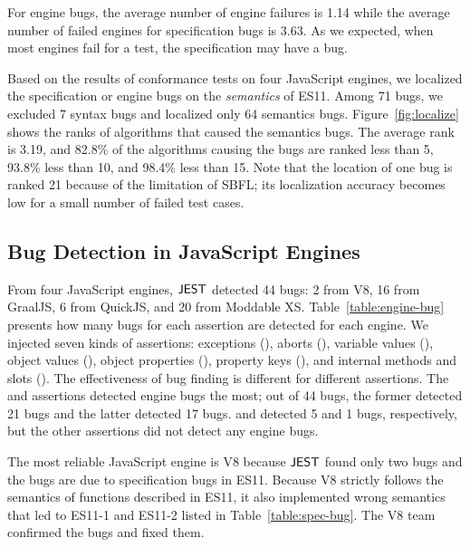 \noindent
For engine bugs, the average number of engine failures is 1.14
while the average number of failed engines for specification bugs is 3.63.
As we expected, when most engines fail for a test, the specification
may have a bug.

Based on the results of conformance tests on four JavaScript engines, we localized
the specification or engine bugs on the \emph{semantics} of ES11.
Among 71 bugs, we excluded 7 syntax bugs and localized only 64 semantics bugs.
Figure~\ref{fig:localize} shows the ranks of algorithms that caused the semantics bugs.
The average rank is 3.19, and 82.8\% of the algorithms causing the
bugs are ranked less than 5, 93.8\% less than 10, and 98.4\% less than 15.
Note that the location of one bug is ranked 21 because of the limitation of SBFL;
its localization accuracy becomes low for a small number of failed test cases.



\subsection{Bug Detection in JavaScript Engines}
From four JavaScript engines, $\tool$ detected 44 bugs:
2 from V8, 16 from GraalJS,
6 from QuickJS, and 20 from Moddable XS.
Table~\ref{table:engine-bug} presents how many bugs for each assertion are detected
for each engine.  We injected seven kinds of assertions: exceptions
(), aborts (), variable values (), object
values (), object properties (), property keys
(), and internal methods and slots ().
The effectiveness of bug finding is different for different assertions.
The  and  assertions detected
engine bugs the most; out of 44 bugs, the former detected 21 bugs
and the latter detected 17 bugs.
 and  detected 5 and 1 bugs, respectively, but the
other assertions did not detect any engine bugs.

The most reliable JavaScript engine is V8 because $\tool$ found only two bugs and
the bugs are due to specification bugs in ES11.  Because V8 strictly follows the
semantics of functions described in ES11, it also implemented wrong semantics
that led to ES11-1 and ES11-2 listed in Table~\ref{table:spec-bug}.
The V8 team confirmed the bugs and fixed them.

